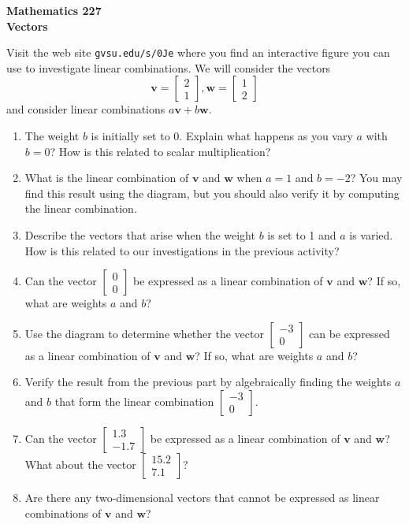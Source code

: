 \documentclass[12pt]{article}
\newcommand{\vs}[1]{\vspace{#1in}}
\newcommand{\vvec}{{\mathbf v}}
\newcommand{\wvec}{{\mathbf w}}
\newcommand{\twovec}[2]{\left[\begin{array}{r}#1 \\ #2
    \end{array}\right]}
\begin{document}
\noindent
{\bf Mathematics 227} \\ 
{\bf Vectors}

\bigskip
Visit the web site {\tt gvsu.edu/s/0Je} where you find an interactive
figure you can use to investigate linear combinations.  We will
consider the vectors
$$
\vvec=\twovec21, \wvec=\twovec12
$$
and consider linear combinations $a\vvec+b\wvec$.  

\begin{enumerate}
\item  The weight $b$ is initially set to 0. Explain what happens as you
  vary $a$ with $b=0$?  How is this related to scalar multiplication?

  \vs{1}

\item What is the linear combination of $\vvec$ and $\wvec$ when $a=1$
  and $b=-2$?  You may find this result using the diagram, but you
  should also verify it by computing the linear combination.

  \vs{1}

\item Describe the vectors that arise when the weight $b$
is set to 1 and $a$ is varied. How is this related to our
investigations in the previous activity?

\vs{1}

\item Can the vector $\twovec00$ be expressed as a linear combination
  of $\vvec$ and $\wvec$? If so, what are weights $a$ and $b$?

  \vs{1}

  \newpage
\item Use the diagram to determine whether the vector $\twovec{-3}{0}$
  can be expressed as a linear combination of $\vvec$ and $\wvec$? If so,
  what are weights $a$ and $b$?

  \vs{1.2}

\item Verify the result from the previous part by algebraically
  finding the weights $a$ and $b$ 
  that form the linear combination $\twovec{-3}{0}$.

  \vs{1.2}

\item Can the vector $\twovec{1.3}{−1.7}$ be expressed as a linear
  combination of $\vvec$ and $\wvec$? What about the vector
  $\twovec{15.2}{7.1}$?

  \vs{1.2}

\item Are there any two-dimensional vectors that cannot be expressed
  as linear combinations of $\vvec$ and $\wvec$?

\end{enumerate}
\end{document}
